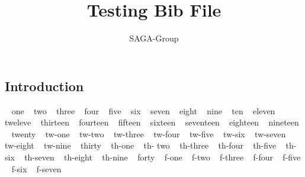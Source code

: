 \documentclass[a4paper,10pt]{article}
\newcommand{\jhanote}[1]{  {\textcolor{red}     { ***Shantenu: #1 }}}
\newcommand{\jhanote}[1]{}
\begin{document}
 \title{ \Large \vspace{-3.5em} Testing Bib File }
 
 \author{ SAGA-Group
 }
 \date{}
 \maketitle
 




\subsection*{Introduction}

~\cite{sirvent2005grid} one
~\cite {sagastuff} two
~\cite {saga-req} three
~\cite {Kaiser:2006qp} four
~\cite {saga-uc} five
  ~\cite {1267323} six
  ~\cite {ogf-gfd-71} seven
  ~\cite {kaiser2006saga} eight
  ~\cite{hirmer2006seamless} nine
    ~\cite {escience07} ten
    ~\cite {ogf-gfd-90} eleven
    ~\cite {saga_gin} tweleve
     ~\cite {saga_condor} thirteen
      ~\cite {Luckow:2008la} fourteen
       ~\cite {saga_gfd90} fifteen
       ~\cite{saga_url} sixteen
       ~\cite {ogf-gwd-r-96} seventeen
       ~\cite {saga_tg08} eighteen
       ~\cite{jha2009developing} nineteen 
       ~\cite {10.1109/GPC.2009.17} twenty
	~\cite {saga_data_intensive_abstractions} tw-one
	~\cite {sagamontage09} tw-two
	~\cite {dpagrid2009} tw-three
	~\cite {1542058} tw-four
	~\cite {co2_escience2009} tw-five
	~\cite {repex_ptrsa} tw-six
	~\cite{gmac09} tw-seven
	~\cite{luckow2009adaptive} tw-eight
	~\cite{jha2009using} tw-nine
	~\cite{katz2009louisiana} thirty
	~\cite{2010RSPTA.368.4089M} th-one
	~\cite {saga_bigjob_condor_cloud} th- two
	~\cite{10.1109/CloudCom.2010.85} th-three
	~\cite{DBLP:conf/hpdc/KimHMAJ10} th-four
	~\cite{Sehgal2011590} th-five
	~\cite{ko-efficient} th-six
	~\cite{merzky-fresh} th-seven
	~\cite {jha-developing} th-eight
	~\cite {saga_mapreduce} th-nine
	~\cite {saga_condor_url} forty
	~\cite {remd-manager_url} f-one
	~\cite {gridrpc_url} f-two
	~\cite {jsaga} f-three
	~\cite {glite} f-four
	~\cite {ogf_web} f-five
	~\cite {saga_core_long} f-six
	~\cite {saga-tools} f-seven
	

 
  
 
\end{document}
